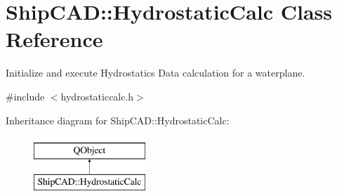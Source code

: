 \hypertarget{classShipCAD_1_1HydrostaticCalc}{\section{Ship\-C\-A\-D\-:\-:Hydrostatic\-Calc Class Reference}
\label{classShipCAD_1_1HydrostaticCalc}
}


Initialize and execute Hydrostatics Data calculation for a waterplane.  




{\ttfamily \#include $<$hydrostaticcalc.\-h$>$}

Inheritance diagram for Ship\-C\-A\-D\-:\-:Hydrostatic\-Calc\-:\begin{figure}[H]
\begin{center}
\leavevmode
\includegraphics[height=2.000000cm]{classShipCAD_1_1HydrostaticCalc}
\end{center}
\end{figure}
